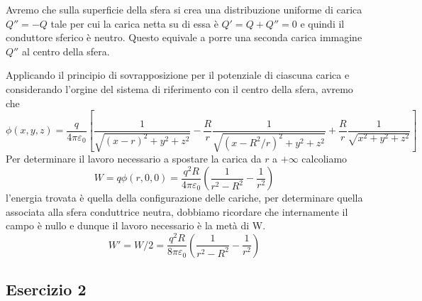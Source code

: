 Avremo che sulla superficie della sfera si crea una distribuzione uniforme di carica $Q'' = -Q$ tale per cui la carica netta su di essa \`e $Q' = Q + Q'' = 0 $ e quindi il conduttore sferico \`e neutro. Questo equivale a porre una seconda carica immagine $Q''$ al centro della sfera. 

Applicando il principio di sovrapposizione per il potenziale di ciascuna carica e considerando l'orgine del sistema di riferimento con il centro della sfera, avremo che 
\begin{equation*}
	\phi(x,y,z) = \frac{q}{4 \pi \varepsilon_0} \left [ \frac{1}{\sqrt{(x-r)^2 + y^2 +z^2}} - \frac{R}{r}\frac{1}{\sqrt{(x-R^2/r)^2 + y^2 + z^2}} + \frac{R}{r} \frac{1}{\sqrt{x^2+y^2+z^2}}\right]
\end{equation*}
Per determinare il lavoro necessario a spostare la carica da $r$ a $+ \infty$ calcoliamo
\begin{equation*}
	W = q\phi(r,0,0) = \frac{q^2R}{4 \pi \varepsilon_0} \left(\frac{1}{r^2-R^2} - \frac{1}{r^2} \right)
\end{equation*}
l'energia trovata \`e quella della configurazione delle cariche, per determinare quella associata alla sfera conduttrice neutra, dobbiamo ricordare che internamente il campo \`e nullo e dunque il lavoro necessario \`e la met\`a di W.
\begin{equation*}
	W' = W/2 = \frac{q^2R}{8 \pi \varepsilon_0} \left(\frac{1}{r^2-R^2} - \frac{1}{r^2} \right)
\end{equation*}

\subsection{Esercizio 2}











